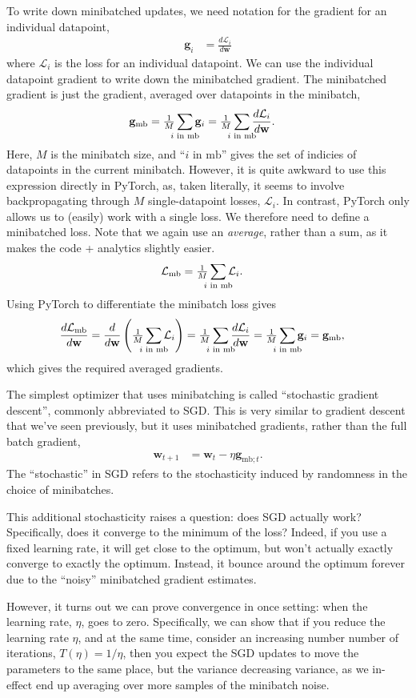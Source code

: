 \documentclass{article}
\newcommand{\dt}[2][]{\frac{d #1}{d #2}}
\newcommand{\dLi}{\dt[{\Li}]}
\newcommand{\dLmb}{\dt[{\Lmb}]}
\newcommand{\bracket}[3]{\left#1 #3 \right#2}
\renewcommand{\b}{\bracket{(}{)}}
\newcommand{\0}{\mathbf{0}}
\newcommand{\g}{\mathbf{g}}
\newcommand{\gmb}{\g_\text{mb}}
\newcommand{\gmbt}{\g_{\text{mb}; t}}
\newcommand{\w}{\mathbf{w}}
\renewcommand{\L}{\mathcal{L}}
\newcommand{\Li}{\L_i}
\newcommand{\Lmb}{\L_\text{mb}}
\newcommand{\iinmb}{{i \text{ in mb}}}
\newcommand{\mbsize}{M}
\newcommand{\mbavg}{\tfrac{1}{\mbsize} \sum_{\mathclap{\iinmb}}}
\begin{document}
To write down minibatched updates, we need notation for the gradient for an individual datapoint,
\begin{align}
  \g_i &= \dLi{\w}
\end{align}
where $\Li$ is the loss for an individual datapoint.
We can use the individual datapoint gradient to write down the minibatched gradient. 
The minibatched gradient is just the gradient, averaged over datapoints in the minibatch,
\begin{align}
  \label{eq:gmb}
  \gmb &= \mbavg \g_i =  \mbavg \dLi{\w}.
\end{align}
Here, $\mbsize$ is the minibatch size, and ``$\iinmb$'' gives the set of indicies of datapoints in the current minibatch.
However, it is quite awkward to use this expression directly in PyTorch, as, taken literally, it seems to involve backpropagating through $M$ single-datapoint losses, $\Li$.
In contrast, PyTorch only allows us to (easily) work with a single loss.
We therefore need to define a minibatched loss.
Note that we again use an \textit{average}, rather than a sum, as it makes the code + analytics slightly easier.
\begin{align}
  \Lmb &= \mbavg \L_i.
\end{align}
Using PyTorch to differentiate the minibatch loss gives 
\begin{align}
  \dLmb{\w} &= \dt{\w} \b{\mbavg \L_i} = \mbavg \dLi{\w} = \mbavg \g_i = \gmb,
\end{align}
which gives the required averaged gradients.

The simplest optimizer that uses minibatching is called ``stochastic gradient descent'', commonly abbreviated to SGD.
This is very similar to gradient descent that we've seen previously, but it uses minibatched gradients, rather than the full batch gradient,
\begin{align}
  \w_{t+1} &= \w_t - \eta \gmbt.
\end{align}
The ``stochastic'' in SGD refers to the stochasticity induced by randomness in the choice of minibatches.

This additional stochasticity raises a question: does SGD actually work?
Specifically, does it converge to the minimum of the loss?
Indeed, if you use a fixed learning rate, it will get close to the optimum, but won't actually exactly converge to exactly the optimum. 
Instead, it bounce around the optimum forever due to the ``noisy'' minibatched gradient estimates.

However, it turns out we can prove convergence in once setting: when the learning rate, $\eta$, goes to zero.
Specifically, we can show that if you reduce the learning rate $\eta$, and at the same time, consider an increasing number number of iterations, $T(\eta) = 1/\eta$, then you expect the SGD updates to move the parameters to the same place, but the variance decreasing variance, as we in-effect end up averaging over more samples of the minibatch noise.
\end{document}
